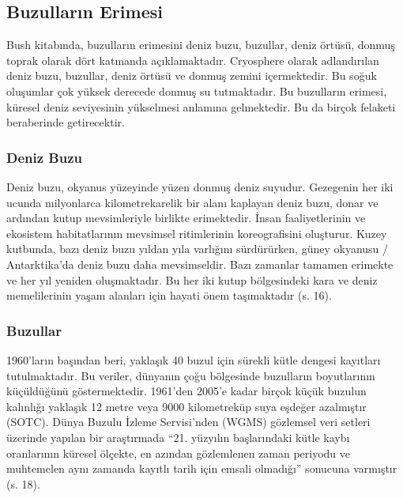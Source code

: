\documentclass[
]{book}
\begin{document}
\hypertarget{buzullarux131n-erimesi}{%
\subsection{Buzulların Erimesi}\label{buzullarux131n-erimesi}}

Bush kitabında, buzulların erimesini deniz buzu, buzullar, deniz örtüsü, donmuş toprak olarak dört katmanda açıklamaktadır. Cryosphere olarak adlandırılan deniz buzu, buzullar, deniz örtüsü ve donmuş zemini içermektedir. Bu soğuk oluşumlar çok yüksek derecede donmuş su tutmaktadır. Bu buzulların erimesi, küresel deniz seviyesinin yükselmesi anlamına gelmektedir. Bu da birçok felaketi beraberinde getirecektir. \citep{bush2020}

\hypertarget{deniz-buzu}{%
\subsubsection{Deniz Buzu}\label{deniz-buzu}}

Deniz buzu, okyanus yüzeyinde yüzen donmuş deniz suyudur. Gezegenin her iki ucunda milyonlarca kilometrekarelik bir alanı kaplayan deniz buzu, donar ve ardından kutup mevsimleriyle birlikte erimektedir. İnsan faaliyetlerinin ve ekosistem habitatlarının mevsimsel ritimlerinin koreografisini oluşturur. Kuzey kutbunda, bazı deniz buzu yıldan yıla varlığını sürdürürken, güney okyanusu / Antarktika'da deniz buzu daha mevsimseldir. Bazı zamanlar tamamen erimekte ve her yıl yeniden oluşmaktadır. Bu her iki kutup bölgesindeki kara ve deniz memelilerinin yaşam alanları için hayati önem taşımaktadır (s. 16). \citep{bush2020}

\hypertarget{buzullar}{%
\subsubsection{Buzullar}\label{buzullar}}

1960'ların başından beri, yaklaşık 40 buzul için sürekli kütle dengesi kayıtları tutulmaktadır. Bu veriler, dünyanın çoğu bölgesinde buzulların boyutlarının küçüldüğünü göstermektedir. 1961'den 2005'e kadar birçok küçük buzulun kalınlığı yaklaşık 12 metre veya 9000 kilometreküp suya eşdeğer azalmıştır (SOTC).
Dünya Buzulu İzleme Servisi'nden (WGMS) gözlemsel veri setleri üzerinde yapılan bir araştırmada ``21. yüzyılın başlarındaki kütle kaybı oranlarının küresel ölçekte, en azından gözlemlenen zaman periyodu ve muhtemelen aynı zamanda kayıtlı tarih için emsali olmadığı'' sonucuna varmıştır (s. 18). \citep{bush2020}
\end{document}

